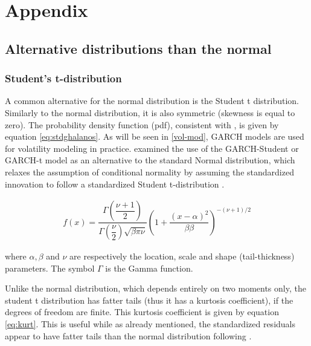 \documentclass[a4paper, twoside]{templates/ociamthesis}
\begin{document}
\hypertarget{appendix}{%
\chapter{Appendix}\label{appendix}}

\hypertarget{conditional-distributions}{%
\section{Alternative distributions than the normal}\label{conditional-distributions}}

\hypertarget{students-t-distribution}{%
\subsection{Student's t-distribution}\label{students-t-distribution}}

\noindent A common alternative for the normal distribution is the Student t distribution. Similarly to the normal distribution, it is also symmetric (skewness is equal to zero). The probability density function (pdf), consistent with \textcite{ghalanos2020}, is given by equation \eqref{eq:stdghalanos}. As will be seen in \ref{vol-mod}, GARCH models are used for volatility modeling in practice. \textcite{bollerslev1987} examined the use of the GARCH-Student or GARCH-t model as an alternative to the standard Normal distribution, which relaxes the assumption of conditional normality by assuming the standardized innovation to follow a standardized Student t-distribution \autocite{bollerslev2008}.

\begin{align}
f(x) = \dfrac{\Gamma(\dfrac{\nu+1}{2})}{\Gamma(\dfrac{\nu}{2})\sqrt{\beta \pi \nu}} \left(1+\dfrac{(x-\alpha)^2}{\beta \beta}\right)^{-(\nu+1)/2}
 \label{eq:stdghalanos}
\end{align}

\noindent where \(\alpha, \beta\) and \(\nu\) are respectively the location, scale and shape (tail-thickness) parameters. The symbol \(\Gamma\) is the Gamma function.

\noindent Unlike the normal distribution, which depends entirely on two moments only, the student t distribution has fatter tails (thus it has a kurtosis coefficient), if the degrees of freedom are finite. This kurtosis coefficient is given by equation \eqref{eq:kurt}. This is useful while as already mentioned, the standardized residuals appear to have fatter tails than the normal distribution following \textcite{bollerslev2008}.
\end{document}
